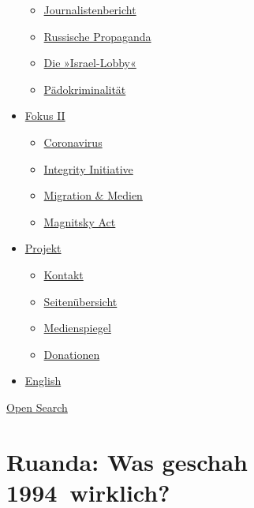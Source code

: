 \begin{itemize}
  \begin{itemize}
  \tightlist
  \item
    \href{https://swprs.org/bericht-eines-journalisten/}{Journalistenbericht}
  \item
    \href{https://swprs.org/russische-propaganda/}{Russische Propaganda}
  \item
    \href{https://swprs.org/die-israel-lobby-fakten-und-mythen/}{Die
    »Israel-Lobby«}
  \item
    \href{https://swprs.org/geopolitik-und-paedokriminalitaet/}{Pädokriminalität}
  \end{itemize}
\item
  \href{https://swprs.org/migration-und-medien/}{Fokus II}

  \begin{itemize}
  \tightlist
  \item
    \href{https://swprs.org/covid-19-hinweis-ii/}{Coronavirus}
  \item
    \href{https://swprs.org/die-integrity-initiative/}{Integrity
    Initiative}
  \item
    \href{https://swprs.org/migration-und-medien/}{Migration \& Medien}
  \item
    \href{https://swprs.org/der-fall-magnitsky/}{Magnitsky Act}
  \end{itemize}
\item
  \href{https://swprs.org/kontakt/}{Projekt}

  \begin{itemize}
  \tightlist
  \item
    \href{https://swprs.org/kontakt/}{Kontakt}
  \item
    \href{https://swprs.org/uebersicht/}{Seitenübersicht}
  \item
    \href{https://swprs.org/medienspiegel/}{Medienspiegel}
  \item
    \href{https://swprs.org/donationen/}{Donationen}
  \end{itemize}
\item
  \href{https://swprs.org/contact/}{English}
\end{itemize}

\protect\hyperlink{}{Open Search}

\hypertarget{ruanda-was-geschah-1994-wirklich}{%
\section{Ruanda: Was geschah
1994~wirklich?}\label{ruanda-was-geschah-1994-wirklich}}

